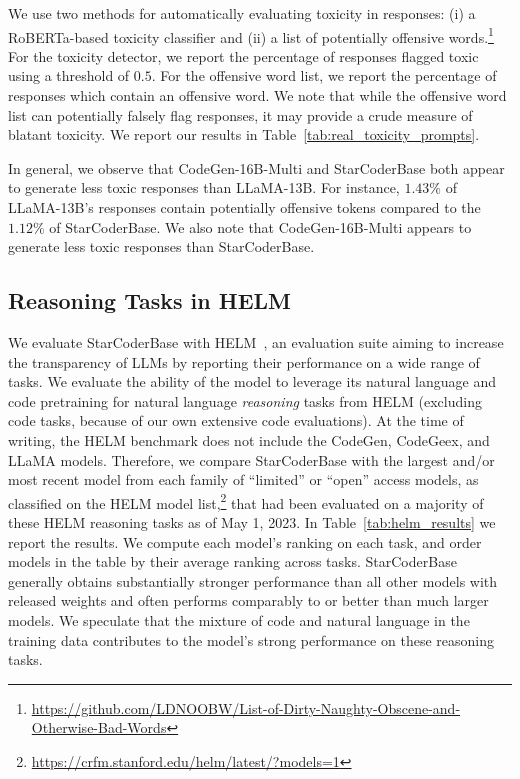 We use two methods for automatically evaluating toxicity in responses: (i) a RoBERTa-based \citep{liu2019roberta} toxicity classifier \citep{vidgen_learning_2021} and (ii) a list of potentially offensive words.\footnote{\url{https://github.com/LDNOOBW/List-of-Dirty-Naughty-Obscene-and-Otherwise-Bad-Words}}
For the toxicity detector, we report the percentage of responses flagged toxic using a threshold of $0.5$. For the offensive word list, we report the percentage of responses which contain an offensive word. We note that while the offensive word list can potentially falsely flag responses, it may provide a crude measure of blatant toxicity. We report our results in Table~\ref{tab:real_toxicity_prompts}. 

In general, we observe that CodeGen-16B-Multi and StarCoderBase both appear to generate less toxic responses than LLaMA-13B. For instance, $1.43\%$ of LLaMA-13B's responses contain potentially offensive tokens compared to the $1.12\%$ of StarCoderBase. We also note that CodeGen-16B-Multi appears to generate less toxic responses than StarCoderBase.

\subsection{Reasoning Tasks in HELM}

We evaluate StarCoderBase with HELM~\citep{liang2022helm}, an evaluation suite aiming to increase the transparency of LLMs by reporting their performance on a wide range of tasks. We evaluate the ability of the model to leverage its natural language and code pretraining for natural language \emph{reasoning} tasks from HELM (excluding code tasks, because of our own extensive code evaluations). At the time of writing, the HELM benchmark does not include the CodeGen, CodeGeex, and LLaMA models. Therefore, we compare StarCoderBase with the largest and/or most recent model from each family of ``limited'' or ``open'' access models, as classified on the HELM model list,\footnote{\url{https://crfm.stanford.edu/helm/latest/?models=1}} that had been evaluated on a majority of these HELM reasoning tasks as of May 1, 2023.  In Table~\ref{tab:helm_results} we report the results. We compute each model's ranking on each task, and order models in the table by their average ranking across tasks. StarCoderBase generally obtains substantially stronger performance than all other models with released weights and often performs comparably to or better than much larger models. We speculate that the mixture of code and natural language in the training data contributes to the model's strong performance on these reasoning tasks.

